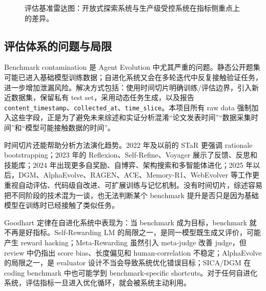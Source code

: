 \begin{figure}[htbp]
\centering
{}
\caption{评估基准雷达图：开放式探索系统与生产级受控系统在指标侧重点上的差异。}
\label{fig:evaluation-radar}
\end{figure}

\subsection{评估体系的问题与局限}

Benchmark contamination 是 Agent Evolution 中尤其严重的问题。静态公开题集可能已进入基础模型训练数据；自进化系统又会在多轮迭代中反复接触验证任务，进一步增加泄漏风险。解决方式包括：使用时间切片明确训练/评估边界，引入新近数据集，保留私有 test set，采用动态任务生成，以及报告 \texttt{content\_timestamp}、\texttt{collected\_at}、\texttt{time\_slice}。本项目所有 raw data 强制加入这些字段，正是为了避免未来综述和实证分析混淆“论文发表时间”“数据采集时间”和“模型可能接触数据的时间”。

时间切片还能帮助分析方法演化趋势。2022 年及以前的 STaR 更强调 rationale bootstrapping；2023 年的 Reflexion、Self-Refine、Voyager 展示了反馈、反思和技能库；2024 年出现更多自奖励、自博弈、架构搜索和多智能体进化；2025 年以后，DGM、AlphaEvolve、RAGEN、ACE、Memory-R1、WebEvolver 等工作更重视自动评估、代码级自改进、可扩展训练与记忆机制。没有时间切片，综述容易把不同阶段的技术混为一谈，也无法判断某个 benchmark 提升是否只是因为基础模型在训练时已经接触了类似任务。

Goodhart 定律在自进化系统中表现为：当 benchmark 成为目标，benchmark 就不再是好指标。Self-Rewarding LM 的局限之一，是同一模型既生成又评价，可能产生 reward hacking；Meta-Rewarding 虽然引入 meta-judge 改善 judge，但 review 中仍指出 score bias、长度偏见和 human-correlation 不稳定；AlphaEvolve 的局限之一，是 evaluator 设计不当会导致系统优化错误目标；SICA/DGM 在 coding benchmark 中也可能学到 benchmark-specific shortcuts。对于任何自进化系统，评估指标一旦进入优化循环，就会被系统主动利用。

